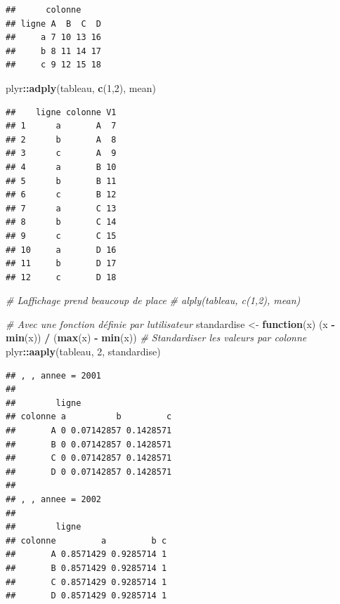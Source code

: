 \documentclass[
  11pt,
]{book}
\newenvironment{Shaded}{\begin{snugshade}}{\end{snugshade}}
\newcommand{\CommentTok}[1]{\textcolor[rgb]{0.56,0.35,0.01}{\textit{#1}}}
\newcommand{\ControlFlowTok}[1]{\textcolor[rgb]{0.13,0.29,0.53}{\textbf{#1}}}
\newcommand{\DecValTok}[1]{\textcolor[rgb]{0.00,0.00,0.81}{#1}}
\newcommand{\KeywordTok}[1]{\textcolor[rgb]{0.13,0.29,0.53}{\textbf{#1}}}
\newcommand{\NormalTok}[1]{#1}
\newcommand{\OperatorTok}[1]{\textcolor[rgb]{0.81,0.36,0.00}{\textbf{#1}}}
\newcommand{\StringTok}[1]{\textcolor[rgb]{0.31,0.60,0.02}{#1}}
\numberwithin{equation}{section}
\numberwithin{countremarque}{section}
\begin{document}
\begin{lstlisting}
##      colonne
## ligne A  B  C  D
##     a 7 10 13 16
##     b 8 11 14 17
##     c 9 12 15 18
\end{lstlisting}

\begin{Shaded}
\begin{Highlighting}[]
\NormalTok{plyr}\OperatorTok{::}\KeywordTok{adply}\NormalTok{(tableau, }\KeywordTok{c}\NormalTok{(}\DecValTok{1}\NormalTok{,}\DecValTok{2}\NormalTok{), mean)}
\end{Highlighting}
\end{Shaded}

\begin{lstlisting}
##    ligne colonne V1
## 1      a       A  7
## 2      b       A  8
## 3      c       A  9
## 4      a       B 10
## 5      b       B 11
## 6      c       B 12
## 7      a       C 13
## 8      b       C 14
## 9      c       C 15
## 10     a       D 16
## 11     b       D 17
## 12     c       D 18
\end{lstlisting}

\begin{Shaded}
\begin{Highlighting}[]
\CommentTok{\# L\textquotesingle{}affichage prend beaucoup de place}
\CommentTok{\# alply(tableau, c(1,2), mean)}

\CommentTok{\# Avec une fonction définie par l\textquotesingle{}utilisateur}
\NormalTok{standardise \textless{}{-}}\StringTok{ }\ControlFlowTok{function}\NormalTok{(x) (x }\OperatorTok{{-}}\StringTok{ }\KeywordTok{min}\NormalTok{(x)) }\OperatorTok{/}\StringTok{ }\NormalTok{(}\KeywordTok{max}\NormalTok{(x) }\OperatorTok{{-}}\StringTok{ }\KeywordTok{min}\NormalTok{(x))}
\CommentTok{\# Standardiser les valeurs par colonne}
\NormalTok{plyr}\OperatorTok{::}\KeywordTok{aaply}\NormalTok{(tableau, }\DecValTok{2}\NormalTok{, standardise)}
\end{Highlighting}
\end{Shaded}

\begin{lstlisting}
## , , annee = 2001
## 
##        ligne
## colonne a          b         c
##       A 0 0.07142857 0.1428571
##       B 0 0.07142857 0.1428571
##       C 0 0.07142857 0.1428571
##       D 0 0.07142857 0.1428571
## 
## , , annee = 2002
## 
##        ligne
## colonne         a         b c
##       A 0.8571429 0.9285714 1
##       B 0.8571429 0.9285714 1
##       C 0.8571429 0.9285714 1
##       D 0.8571429 0.9285714 1
\end{lstlisting}
\end{document}

